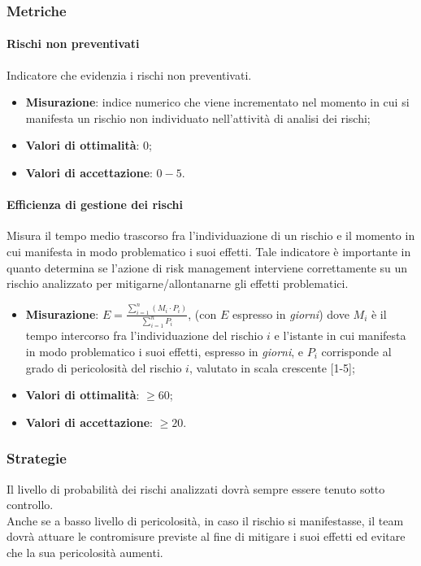 \subsubsection{Metriche}
\paragraph{Rischi non preventivati}
\label{riskNonPrev}
Indicatore che evidenzia i rischi non preventivati.
\begin{itemize}
\item \textbf{Misurazione}: indice numerico che viene incrementato nel momento in cui si manifesta un rischio non individuato nell'attività di analisi dei rischi;
\item \textbf{Valori di ottimalità}: $0$;
\item \textbf{Valori di accettazione}: $0 - 5$.
\end{itemize}
\paragraph{Efficienza di gestione dei rischi}
\label{effGestRischi}
Misura il tempo medio trascorso fra l'individuazione di un rischio e il momento in cui manifesta in modo problematico i suoi effetti. Tale indicatore è importante in quanto determina se l'azione di risk management interviene correttamente su un rischio analizzato per mitigarne/allontanarne gli effetti problematici.
\begin{itemize}
\item \textbf{Misurazione}: $E = \frac{\sum_{i=1}^{n} (M_{i} \cdot P_{i})}{\sum_{i=1}^{n} P_{i}}$, (con $E$ espresso in \textit{giorni}) dove $M_{i}$ è il tempo intercorso fra l'individuazione del rischio $i$ e l'istante in cui manifesta in modo problematico i suoi effetti, espresso in \textit{giorni}, e $P_{i}$ corrisponde al grado di pericolosità del rischio $i$, valutato in scala crescente [1-5];
\item \textbf{Valori di ottimalità}: $\geq 60$;
\item \textbf{Valori di accettazione}: $\geq 20$.
\end{itemize}
\subsubsection{Strategie}
Il livello di probabilità dei rischi analizzati dovrà sempre essere tenuto sotto controllo.\\
Anche se a basso livello di pericolosità, in caso il rischio si manifestasse, il team dovrà attuare le contromisure previste al fine di mitigare i suoi effetti ed evitare che la sua pericolosità aumenti.
